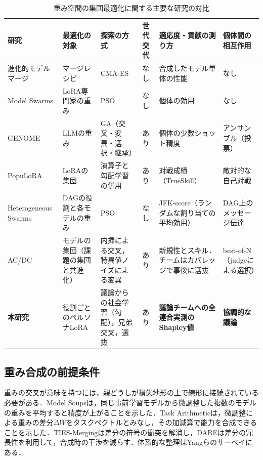 \begin{table}[htbp]
\caption{重み空間の集団最適化に関する主要な研究の対比}
\label{tab:2.1}
\centering
\footnotesize
\setlength{\tabcolsep}{3pt}
\begin{tabular}{|p{2.4cm}|p{2.3cm}|p{2.4cm}|p{1.3cm}|p{2.8cm}|p{2.2cm}|}
\hline
研究 & 最適化の対象 & 探索の方式 & 世代交代 & 適応度・貢献の測り方 & 個体間の相互作用 \\
\hline
進化的モデルマージ\cite{akiba2024evolutionary} & マージレシピ & CMA-ES & なし & 合成したモデル単体の性能 & なし \\
\hline
Model Swarms\cite{feng2024model} & LoRA専門家の重み & PSO & なし & 個体の効用 & なし \\
\hline
GENOME\cite{zhang2025genome} & LLMの重み & GA（交叉・変異・選択・継承） & あり & 個体の少数ショット精度 & アンサンブル（投票） \\
\hline
PopuLoRA\cite{creuscastanyer2026populora} & LoRAの集団 & 演算子と勾配学習の併用 & あり & 対戦成績（TrueSkill） & 敵対的な自己対戦 \\
\hline
Heterogeneous Swarms\cite{feng2025heterogeneous} & DAGの役割と各モデルの重み & PSO & なし & JFK-score（ランダムな割り当ての平均効用） & DAG上のメッセージ伝達 \\
\hline
AC/DC\cite{dai2026acdc} & モデルの集団（課題の集団と共進化） & 内挿による交叉，特異値ノイズによる変異 & あり & 新規性とスキル．チームはカバレッジで事後に選抜 & best-of-N（judgeによる選択） \\
\hline
\textbf{本研究} & 役割ごとのペルソナLoRA & 議論からの社会学習（勾配），兄弟交叉，選抜 & あり & \textbf{議論チームへの全連合実測のShapley値} & \textbf{協調的な議論} \\
\hline
\end{tabular}
\end{table}

\subsection{重み合成の前提条件}
\label{sec:2.4.2}

重みの交叉が意味を持つには，親どうしが損失地形の上で線形に接続されている必要がある．Model Soups\cite{wortsman2022model}は，同じ事前学習モデルから微調整した複数のモデルの重みを平均すると精度が上がることを示した．Task Arithmetic\cite{ilharco2022editing}は，微調整による重みの差分$\Delta W$をタスクベクトルとみなし，その加減算で能力を合成できることを示した．TIES-Merging\cite{yadav2023ties}は差分の符号の衝突を解消し，DARE\cite{yu2023language}は差分の冗長性を利用して，合成時の干渉を減らす．体系的な整理はYangら\cite{yang2024model}のサーベイにある．

